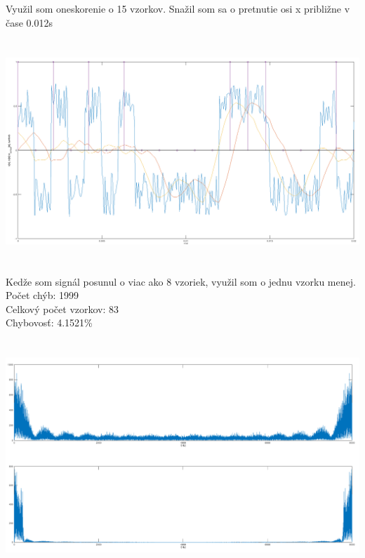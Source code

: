 \documentclass[a4paper,12pt,twocolumn]{article}
\begin{document}
\section{}
Využil som oneskorenie o 15 vzorkov. Snažil som sa o pretnutie osi x približne v čase 0.012s
\section{}
\includegraphics[width=\linewidth]{6}
\section{}
Kedže som signál posunul o viac ako 8 vzoriek, využil som o jednu vzorku menej.\\
Počet chýb: 1999\\
Celkový počet vzorkov: 83\\
Chybovosť: 4.1521\%
\section{}
\includegraphics[width=\linewidth]{8}
\end{document}
